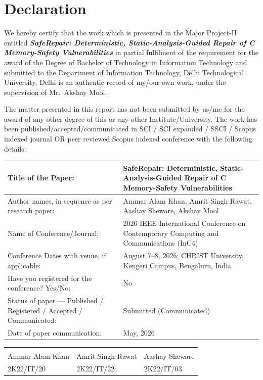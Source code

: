 \chapter*{Declaration}

We hereby certify that the work which is presented in the Major Project-II entitled \textbf{\textit{SafeRepair: Deterministic, Static-Analysis-Guided Repair of C Memory-Safety Vulnerabilities}} in partial fulfilment of the requirement for the award of the Degree of Bachelor of Technology in Information Technology and submitted to the Department of Information Technology, Delhi Technological University, Delhi is an authentic record of my/our own work, under the supervision of Mr.\ Akshay Mool.

The matter presented in this report has not been submitted by us/me for the award of any other degree of this or any other Institute/University. The work has been published/accepted/communicated in SCI / SCI expanded / SSCI / Scopus indexed journal OR peer reviewed Scopus indexed conference with the following details:

\vspace{0.5cm}

{\small
\renewcommand{\arraystretch}{1.3}
\begin{tabularx}{\linewidth}{|p{5.5cm}|X|}
\hline
Title of the Paper: &
  SafeRepair: Deterministic, Static-Analysis-Guided Repair of C Memory-Safety Vulnerabilities \\
\hline
Author names, in sequence as per research paper: &
  Ammar Alam Khan, Amrit Singh Rawat, Aashay Sheware, Akshay Mool \\
\hline
Name of Conference/Journal: &
  2026 IEEE International Conference on Contemporary Computing and Communications (InC4) \\
\hline
Conference Dates with venue, if applicable: &
  August 7--8, 2026; CHRIST University, Kengeri Campus, Bengaluru, India \\
\hline
Have you registered for the conference? Yes/No: &
  No \\
\hline
Status of paper --- Published / Registered / Accepted / Communicated: &
  Submitted (Communicated) \\
\hline
Date of paper communication: &
  May, 2026 \\
\hline
\end{tabularx}
}%

\vspace{1cm}

\begin{tabular}{p{4.8cm} p{4.8cm} p{4.8cm}}
 & & \\[1.8cm]
Ammar Alam Khan  & Amrit Singh Rawat & Aashay Sheware \\
2K22/IT/20       & 2K22/IT/22        & 2K22/IT/03     \\
\end{tabular}
